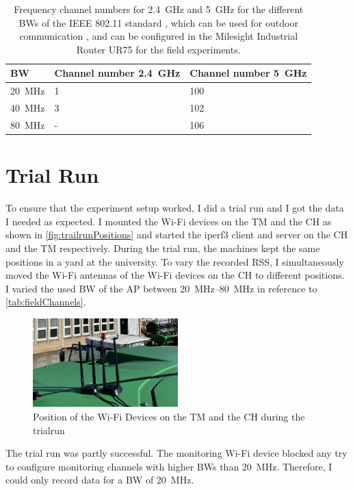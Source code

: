 \begin{table}[H]
	\centering
	\begin{tabular}{>{\centering}p{2cm}p{4cm}p{4cm}}
		\toprule
		\ac{BW} & Channel number \SI{2.4}{\giga\hertz} & Channel number \SI{5}{\giga\hertz}\\
		\midrule
		\SI{20}{\mega\hertz} & \num{1}&
		\num{100} \\
		\SI{40}{\mega\hertz} &
		\num{3}
		& \num{102} \\
		\SI{80}{\mega\hertz} &
		- & \num{106} \\
		\bottomrule
	\end{tabular}
	\caption{Frequency channel numbers for \SI{2.4}{\giga\hertz} and \SI{5}{\giga\hertz} for the different \acfp{BW} of the IEEE 802.11 standard \cite{ieee_standard_2021ax}, which can be used for
	outdoor communication \cite{freq_plan_24G}, \cite{freq_plan_5G} and can be configured in the Milesight Industrial Router UR75 for
	the field experiments.}
	\label{tab:fieldChannels}
\end{table}

\section{Trial Run}

To ensure that the experiment setup worked, I did a trial run and I got the data I needed as expected.
I mounted the Wi-Fi devices on the \ac{TM} and the \ac{CH} as shown in \autoref{fig:trailrunPositions} and
started the iperf3 client and server on the \ac{CH} and the \ac{TM} respectively.
During the trial run, the machines kept the same positions in a yard at the university.
To vary the recorded \ac{RSS}, I simultaneously moved the Wi-Fi antennas of the Wi-Fi devices on the \ac{CH} to
different positions.
I varied the used \ac{BW} of the \ac{AP} between \SIrange{20}{80}{\mega\hertz} in reference to \autoref{tab:fieldChannels}.
\begin{figure}[H]%
   \centering
   \includegraphics[width=0.5\textwidth]{Latex/figures/trainRun}
   \caption{Position of the Wi-Fi Devices on the \ac{TM} and the \ac{CH} during the trialrun}
   \label{fig:trailrunPositions}%
\end{figure}
The trial run was partly successful.
The monitoring Wi-Fi device blocked any try to configure monitoring channels with higher \ac{BW}s than \SI{20}{\mega\hertz}.
Therefore, I could only record data for a \ac{BW} of \SI{20}{\mega\hertz}.

